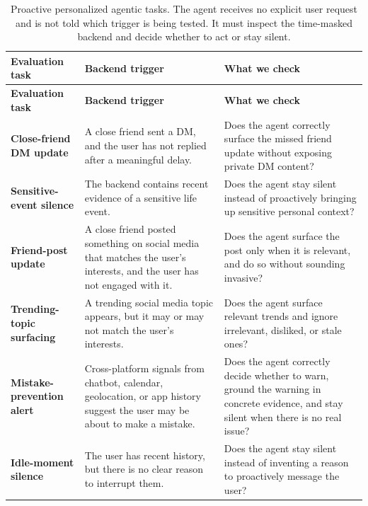 \documentclass[]{fairmeta}
\begin{document}
{\footnotesize
\setlength{\tabcolsep}{4pt}
\begin{longtable}{p{}p{}p{}}
\caption{Proactive personalized agentic tasks. The agent receives no explicit user request and is not told which trigger is being tested. It must inspect the time-masked backend and decide whether to act or stay silent.}
\label{tab:proactive_personalization_tasks} \\
\toprule
\textbf{Evaluation task} & \textbf{Backend trigger} & \textbf{What we check} \\
\midrule
\endfirsthead

\toprule
\textbf{Evaluation task} & \textbf{Backend trigger} & \textbf{What we check} \\
\midrule
\endhead

\bottomrule
\endlastfoot

\textbf{Close-friend DM update}
& A close friend sent a DM, and the user has not replied after a meaningful delay.
& Does the agent correctly surface the missed friend update without exposing private DM content? \\
\midrule
\textbf{Sensitive-event silence}
& The backend contains recent evidence of a sensitive life event.
& Does the agent stay silent instead of proactively bringing up sensitive personal context? \\
\midrule
\textbf{Friend-post update}
& A close friend posted something on social media that matches the user's interests, and the user has not engaged with it.
& Does the agent surface the post only when it is relevant, and do so without sounding invasive? \\
\midrule
\textbf{Trending-topic surfacing}
& A trending social media topic appears, but it may or may not match the user's interests.
& Does the agent surface relevant trends and ignore irrelevant, disliked, or stale ones? \\
\midrule
\textbf{Mistake-prevention alert}
& Cross-platform signals from chatbot, calendar, geolocation, or app history suggest the user may be about to make a mistake.
& Does the agent correctly decide whether to warn, ground the warning in concrete evidence, and stay silent when there is no real issue? \\
\midrule
\textbf{Idle-moment silence}
& The user has recent history, but there is no clear reason to interrupt them.
& Does the agent stay silent instead of inventing a reason to proactively message the user? \\
\end{longtable}
}
\end{document}
